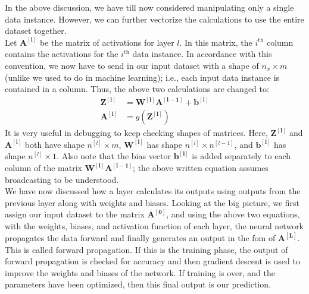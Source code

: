 \documentclass[a4paper, 12pt]{report}
\begin{document}
In the above discussion, we have till now considered manipulating only a single data instance. However, we can further vectorize the calculations to use the entire dataset together. \\
\break
Let $\bm{A^{\left[l\right]}}$ be the matrix of activations for layer $l$. In this matrix, the $i^{\text{th}}$ column contains the activations for the $i^{\text{th}}$ data instance. In accordance with this convention, we now have to send in our input dataset with a shape of $n_x \times m$ (unlike we used to do in machine learning); i.e., each input data instance is contained in a column. Thus, the above two calculations are changed to:
\begin{align*}
\bm{Z^{\left[l\right]}} &= \bm{W^{\left[l\right]}}\bm{A^{\left[l-1\right]}} + \bm{b^{\left[l\right]}} \\
\bm{A^{\left[l\right]}} &= g\left(\bm{Z^{\left[l\right]}}\right)
\end{align*}
It is very useful in debugging to keep checking shapes of matrices. Here, $\bm{Z^{\left[l\right]}}$ and $\bm{A^{\left[l\right]}}$ both have shape $n^{\left[l\right]} \times m$, $\bm{W^{\left[l\right]}}$ has shape $n^{\left[l\right]} \times n^{\left[l-1\right]}$, and $\bm{b^{\left[l\right]}}$ has shape $n^{\left[l\right]} \times 1$. Also note that the bias vector $\bm{b^{\left[l\right]}}$ is added separately to each column of the matrix $\bm{W^{\left[l\right]}}\bm{A^{\left[l-1\right]}}$; the above written equation assumes broadcasting to be understood. \\
\break
We have now discussed how a layer calculates its outputs using outputs from the previous layer along with weights and biases. Looking at the big picture, we first assign our input dataset to the matrix $\bm{A^{\left[0\right]}}$, and using the above two equations, with the weights, biases, and activation function of each layer, the neural network propagates the data forward and finally generates an output in the fom of $\bm{A^{\left[L\right]}}$. This is called forward propagation. If this is the training phase, the output of forward propagation is checked for accuracy and then gradient descent is used to improve the weights and biases of the network. If training is over, and the parameters have been optimized, then this final output is our prediction.
\end{document}
